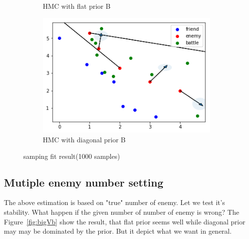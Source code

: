 \documentclass{article}
\begin{document}
\begin{figure}[h]
\begin{subfigure}[b]{0.45\linewidth}
    \caption{HMC with flat prior B}
  \end{subfigure}
  \begin{subfigure}[b]{0.45\linewidth}
    \includegraphics[width=\linewidth]{Sampling42.png}
    \caption{HMC with diagonal prior B}
  \end{subfigure}
  \caption{samping fit result(1000 samples)}
  \label{fig:SamplingTen}
\end{figure}

\subsection{Mutiple enemy number setting}

The above estimation is based on "true" number of enemy. Let we test it's stability. 
What happen if the given number of number of enemy is wrong? The Figure~\ref{fig:bigVb} 
show the result, that flat prior seems well while diagonal prior may may be dominated by 
the prior. But it depict what we want in general.
\end{document}
